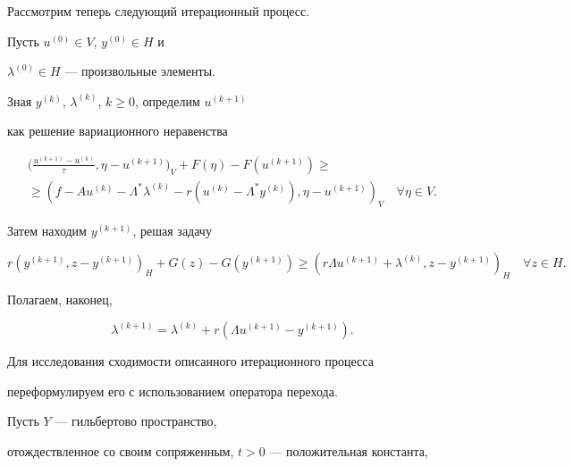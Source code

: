 Рассмотрим теперь следующий итерационный процесс.


Пусть $u^{(0)} \in V$, $y^{(0)} \in H$ и 


$\lambda^{(0)} \in H$ --- произвольные элементы.


Зная $y^{(k)}$, $\lambda^{(k)}$, $k\ge0$, определим $u^{(k+1)}$


как решение вариационного неравенства


\begin{multline}


\bigg(\frac{u^{(k+1)}-u^{(k)}}{\tau}, \eta -u^{(k+1)} \bigg)_V+


F(\eta)-F(u^{(k+1)}) \geq \\


\geq ({f-A u^{(k)}-\Lambda ^* \lambda^{(k)}-


r (u^{(k)}-\Lambda^* y^{(k)})}, \eta -u^{(k+1)})_V \quad \forall \eta \in V.


\label{2bz15}


\end{multline}


Затем находим $y^{(k+1)}$, решая задачу


\begin{equation}


r (y^{(k+1)} , z-y^{(k+1)})_H+G(z)-G(y^{(k+1)}) \geq 


(r \Lambda u^{(k+1)}+ \lambda^{(k)} , z-y^{(k+1)})_H \quad \forall z \in H.


\label{2bz16}


\end{equation}


Полагаем, наконец,


\begin{equation}


\lambda^{(k+1)}=\lambda^{(k)}+r ({\Lambda u^{(k+1)}-y^{(k+1)}}).


\label{2bz17} 


\end{equation}





Для исследования сходимости описанного итерационного процесса 


переформулируем его с использованием оператора перехода.





Пусть $Y$ --- гильбертово пространство,


отождествленное со своим сопряженным, $t>0$ --- положительная константа, 



